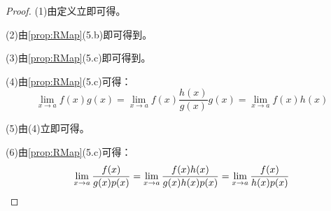 \begin{proof}
	(1)由定义立即可得。\par
	(2)由\cref{prop:RMap}(5.b)即可得到。\par
	(3)由\cref{prop:RMap}(5.c)即可得到。\par
	(4)由\cref{prop:RMap}(5.c)可得：
	\begin{equation*}
		\lim_{x\to a}f(x)g(x)=\lim_{x\to a}f(x)\frac{h(x)}{g(x)}g(x)=\lim_{x\to a}f(x)h(x)
	\end{equation*}\par
	(5)由(4)立即可得。\par
	(6)由\cref{prop:RMap}(5.c)可得：
	\begin{equation*}
		\lim_{x\to a}\dfrac{f(x)}{g(x)p(x)}=\lim_{x\to a}\dfrac{f(x)h(x)}{g(x)h(x)p(x)}=\lim_{x\to a}\dfrac{f(x)}{h(x)p(x)}\qedhere
	\end{equation*}
\end{proof}